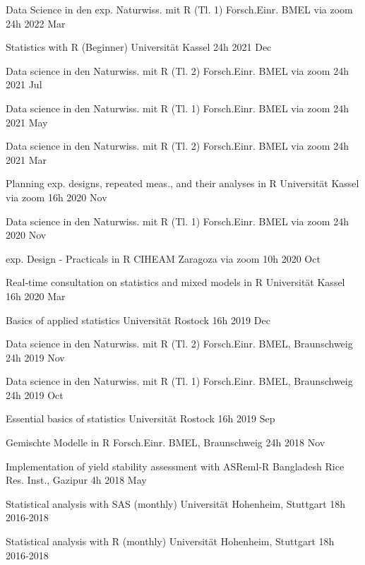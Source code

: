 \documentclass[11pt,a4paper,]{awesome-cv}
\begin{document}
\begin{cvhonors}
\cvhonor
{Data Science in den exp. Naturwiss. mit R (Tl. 1)  }
{Forsch.Einr. BMEL via zoom}
{24h}
{2022 Mar  }

\cvhonor
{Statistics with R (Beginner)  }
{Universität Kassel}
{24h}
{2021 Dec  }

\cvhonor
{Data science in den Naturwiss. mit R (Tl. 2)  }
{Forsch.Einr. BMEL via zoom}
{24h}
{2021 Jul  }

\cvhonor
{Data science in den Naturwiss. mit R (Tl. 1)  }
{Forsch.Einr. BMEL via zoom}
{24h}
{2021 May  }

\cvhonor
{Data science in den Naturwiss. mit R (Tl. 2)  }
{Forsch.Einr. BMEL via zoom}
{24h}
{2021 Mar  }

\cvhonor
{Planning exp. designs, repeated meas., and their analyses in R  }
{Universität Kassel via zoom}
{16h}
{2020 Nov  }

\cvhonor
{Data science in den Naturwiss. mit R (Tl. 1)  }
{Forsch.Einr. BMEL via zoom}
{24h}
{2020 Nov  }

\cvhonor
{exp. Design - Practicals in R  }
{CIHEAM Zaragoza via zoom}
{10h}
{2020 Oct  }

\cvhonor
{Real‑time consultation on statistics and mixed models in R  }
{Universität Kassel}
{16h}
{2020 Mar  }

\cvhonor
{Basics of applied statistics  }
{Universität Rostock}
{16h}
{2019 Dec  }

\cvhonor
{Data science in den Naturwiss. mit R (Tl. 2)  }
{Forsch.Einr. BMEL, Braunschweig}
{24h}
{2019 Nov  }

\cvhonor
{Data science in den Naturwiss. mit R (Tl. 1)  }
{Forsch.Einr. BMEL, Braunschweig}
{24h}
{2019 Oct  }

\cvhonor
{Essential basics of statistics  }
{Universität Rostock}
{16h}
{2019 Sep  }

\cvhonor
{Gemischte Modelle in R  }
{Forsch.Einr. BMEL, Braunschweig}
{24h}
{2018 Nov  }

\cvhonor
{Implementation of yield stability assessment with ASReml‑R  }
{Bangladesh Rice Res. Inst., Gazipur}
{4h}
{2018 May  }

\cvhonor
{Statistical analysis with SAS (monthly)  }
{Universität Hohenheim, Stuttgart}
{18h}
{2016‑2018  }

\cvhonor
{Statistical analysis with R (monthly)  }
{Universität Hohenheim, Stuttgart}
{18h}
{2016‑2018  }\end{cvhonors}
\end{document}
